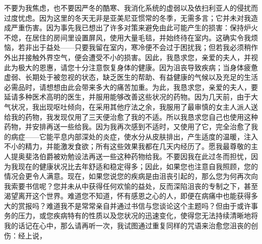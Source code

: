 不要为我焦虑，也不要因严冬的酷寒、我消化系统的虚弱以及依扫利亚人的侵扰而过度忧虑。因为这里的冬天无非是亚美尼亚惯常的冬季，无需多言；它并未对我造成严重伤害。因为事先我已想出了许多对策来避免由此可能产生的损害：保持炉火不熄，在居住的房间里设置屏风，使用大量毛毯，并始终待在室内。这确实令我烦恼，若非出于益处——只要我留在室内，寒冷便不会过于困扰我；但若我必须稍作外出并接触外界空气，便会遭受不小的损害。因此，我恳求您，亲爱的夫人，并视此为极大的恩惠，请您十分注意恢复身体的健康。因为沮丧导致疾病；当身体疲惫虚弱、长期处于被忽视的状态，缺乏医生的帮助、有益健康的气候以及充足的生活必需品时，请想想由此会带来多大的痛苦加重。为此，我恳求您，亲爱的夫人，要延请多种医术高明的医生，并服用能够改善这些状况的药物。因为几天前，由于大气状况，我出现呕吐倾向，在采用其他疗法之余，我服用了最审慎的女主人派人送给我的药物，我发现仅用了三天便治愈了我的不适。所以我恳求您自己也使用这种药物，并安排再送一些给我。因为我再次感到不适时，又使用了它，完全治愈了我的病症——它能平息内部深处的炎症，使水分从皮肤排出，产生适度的温暖，注入不小的精力，并能激发食欲；所有这些效果我都在几天内经历了。愿我最尊敬的主人提奥斐洛伯爵被劝勉设法再送一些这种药物给我。不要因我在此过冬而担忧，因为我现在的健康状况比去年舒适和稳定得多；因此，如果您也注意自我照顾，您的情况会更令人满意。现在，如果您说您的疾病是由沮丧引起的，那么您为何再次向我索要书信呢？您并未从中获得任何欢愉的益处，反而深陷沮丧的专制之下，甚至渴望离开这个世界。难道您不知道，怀有感恩之心的人，即便在病痛中也能获得多大的赏报吗？难道我不是常常亲自并通过书信与您谈论这个主题吗？但由于或许事务的压力，或您疾病特有的性质以及您状况的迅速变化，使得您无法持续清晰地将我的话记在心中，那么请再听一次，我试图通过重复同样的咒语来治愈您沮丧的创伤：经上说，\par

